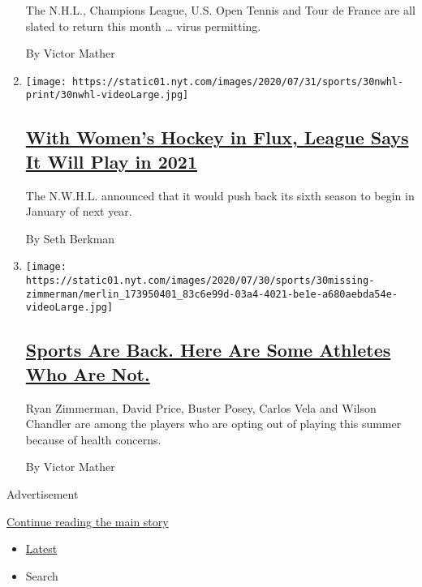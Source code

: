 \begin{enumerate}
  The N.H.L., Champions League, U.S. Open Tennis and Tour de France are
  all slated to return this month \ldots{} virus permitting.

  By Victor Mather
\item
  \texttt{[image: https://static01.nyt.com/images/2020/07/31/sports/30nwhl-print/30nwhl-videoLarge.jpg]}

  \hypertarget{with-womens-hockey-in-flux-league-says-it-will-play-in-2021}{%
  \subsection{\texorpdfstring{\href{/2020/07/30/sports/hockey/nwhl-postpone-season.html}{With
  Women's Hockey in Flux, League Says It Will Play in
  2021}}{With Women's Hockey in Flux, League Says It Will Play in 2021}}\label{with-womens-hockey-in-flux-league-says-it-will-play-in-2021}}

  The N.W.H.L. announced that it would push back its sixth season to
  begin in January of next year.

  By Seth Berkman
\item
  \texttt{[image: https://static01.nyt.com/images/2020/07/30/sports/30missing-zimmerman/merlin\_173950401\_83c6e99d-03a4-4021-be1e-a680aebda54e-videoLarge.jpg]}

  \hypertarget{sports-are-back-here-are-some-athletes-who-are-not}{%
  \subsection{\texorpdfstring{\href{/2020/07/30/sports/players-opt-out.html}{Sports
  Are Back. Here Are Some Athletes Who Are
  Not.}}{Sports Are Back. Here Are Some Athletes Who Are Not.}}\label{sports-are-back-here-are-some-athletes-who-are-not}}

  Ryan Zimmerman, David Price, Buster Posey, Carlos Vela and Wilson
  Chandler are among the players who are opting out of playing this
  summer because of health concerns.

  By Victor Mather
\end{enumerate}

Advertisement

\protect\hyperlink{after-mid1}{Continue reading the main story}

\begin{itemize}
\tightlist
\item
  \protect\hyperlink{stream-panel}{Latest}
\item
  Search
\end{itemize}

